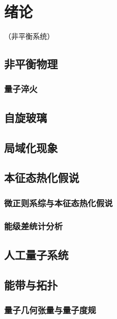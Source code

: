 
\chapter{绪论}

（非平衡系统）

\section{非平衡物理}

	\subsection{量子淬火}

\section{自旋玻璃}

\section{局域化现象}

\section{本征态热化假说}

	\subsection{微正则系综与本征态热化假说}

	\subsection{能级差统计分析}

\section{人工量子系统}

\section{能带与拓扑}

	\subsection{量子几何张量与量子度规}

